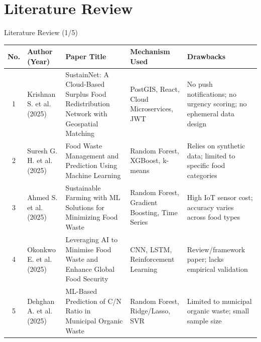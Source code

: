 \documentclass[aspectratio=169,xcolor=dvipsnames]{beamer}
\begin{document}
\section{Literature Review}

\begin{frame}{Literature Review (1/5)}
\scriptsize
\renewcommand{\arraystretch}{1.25}
\setlength{\tabcolsep}{2.5pt}

\begin{tabular}{|c|p{1.7cm}|p{3.6cm}|p{3.1cm}|p{3.2cm}|}
\hline
\textbf{No.} &
\textbf{Author (Year)} &
\textbf{Paper Title} &
\textbf{Mechanism Used} &
\textbf{Drawbacks} \\
\hline

1 &
Krishnan S. et al. (2025) &
SustainNet: A Cloud-Based Surplus Food Redistribution Network with Geospatial Matching &
PostGIS, React, Cloud Microservices, JWT &
No push notifications; no urgency scoring; no ephemeral data design \\
\hline

2 &
Suresh G. H. et al. (2025) &
Food Waste Management and Prediction Using Machine Learning &
Random Forest, XGBoost, k-means &
Relies on synthetic data; limited to specific food categories \\
\hline

3 &
Ahmed S. et al. (2025) &
Sustainable Farming with ML Solutions for Minimizing Food Waste &
Random Forest, Gradient Boosting, Time Series &
High IoT sensor cost; accuracy varies across food types \\
\hline

4 &
Okonkwo E. et al. (2025) &
Leveraging AI to Minimise Food Waste and Enhance Global Food Security &
CNN, LSTM, Reinforcement Learning &
Review/framework paper; lacks empirical validation \\
\hline

5 &
Dehghan A. et al. (2025) &
ML-Based Prediction of C/N Ratio in Municipal Organic Waste &
Random Forest, Ridge/Lasso, SVR &
Limited to municipal organic waste; small sample size \\
\hline

\end{tabular}
\end{frame}
\end{document}
